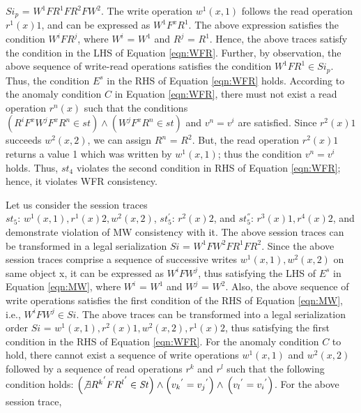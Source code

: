\documentclass{sig-alternate-05-2015}
\begin{document}
 $\mathit{Si}_p$  = $W^1 F R^1 F R^2 F W^2$. The write operation $w^1(x,1)$ follows
  the read operation $r^1(x){1}$, and can be expressed as $W^1 F^x R^1$. The above expression satisfies
 the condition $W^i F R^j$, where $W^i$ = $W^1$ and $R^j$ = $R^1$. Hence, the above traces satisfy the
 condition in the LHS of Equation \ref{eqn:WFR}. Further, by observation, the above sequence of write-read
 operations satisfies the condition  $W^1 F R^1 \in \mathit{Si}_p$. Thus, the condition $E^s$ in the RHS of
 Equation \ref{eqn:WFR} holds. According to the anomaly condition $C$ in Equation \ref{eqn:WFR}, there must not
 exist a read operation $r^n(x)$ such that the conditions $\left( R^i F^x W^j F^x R^n \in \mathit{st} \right) \wedge
\left( W^j F^x R^n \in \mathit{st} \right)$ and $v^n = v^i$ are satisfied. Since $r^2(x){1}$ succeeds  $w^2(x,2)$, we can
assign $R^n$ = $R^2$. But, the read operation $r^2(x){1}$ returns a value 1 which was written by $w^1(x,1)$; thus
the condition $v^n = v^i$ holds. Thus, $\mathit{st}_4$ violates the second condition in
 RHS of Equation \ref{eqn:WFR}; hence, it violates WFR consistency.
 \par Let us consider the session traces \\ $\mathit{st}_5$: $w^1(x,1), r^1(x){2}, w^2(x,2)$, $\mathit{st}_5^{'}$: $r^2(x){2}$, and
 $\mathit{st}_5^{''}$: $r^3(x){1}, r^4(x){2}$, and demonstrate violation of
  MW consistency with it. The above session traces can be transformed in a legal serialization
  $\mathit{Si}$ = $W^1 F W^2 F R^1 F R^2$.
   Since the above session traces comprise a sequence of successive writes $w^1(x,1), w^2(x,2)$ on same object x,
   it can be expressed as $W^i F W^j$, thus satisfying the LHS of $E^s$ in Equation \ref{eqn:MW}, where $W^i$ = $W^1$ and $W^j$ = $W^2$.
  Also, the above sequence of write operations satisfies the first condition of the RHS of Equation \ref{eqn:MW},
  i.e., $W^i F W^j \in \mathit{Si}$. The above traces can be transformed into a legal serialization order $\mathit{Si}$ =
   $w^1(x,1), r^2(x){1}, w^2(x,2), r^1(x){2}$, thus satisfying the first condition in the RHS of Equation \ref{eqn:WFR}.
   For the anomaly condition $C$ to hold, there cannot exist a sequence of write operations $w^1(x,1)$ and
    $w^2(x,2)$ followed by a sequence of read operations $r^k$ and $r^l$ such that the following condition holds:
  $\left( \not\exists  {R^k}^{'} F  {R^l}^{'} \in \mathit{St} \right)
   \wedge  \left( {v_k}^{'} = {v_j}^{'} \right) \wedge \\
   \left( {v_l}^{'} = {v_i}^{'} \right)$. For the above session trace,
\end{document}
